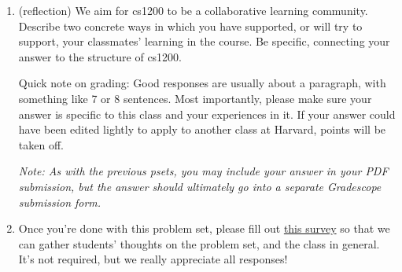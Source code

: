 \documentclass[11pt]{article}
\begin{document}
\begin{enumerate}
\begin{enumerate}
    \end{enumerate}
    
    \emph{Food for thought (do read - it's an important take-away from this problem):} This problem concerns size-augmented binary search trees. In lecture, we discussed AVL trees, which are balanced binary search trees where every vertex contains an additional \textit{height} attribute containing the length of the longest path from the vertex to a leaf (height-augmented). Additionally, every pair of siblings in the tree have heights differing by at most 1, so the tree is height-balanced. Note that if we augment a binary search tree both by size (as in the above problem) and by height (and use it to maintain the AVL property), then we create a dynamic data structure able to perform \texttt{search}, \texttt{insert}, and \texttt{select} all in time $O(\log n)$. 

\item (reflection) We aim for cs1200 to be a collaborative learning community. Describe two concrete ways in which you have supported, or will try to support, your classmates' learning in the course.  Be specific, connecting your answer to the structure of cs1200. 

Quick note on grading: Good responses are usually about a paragraph, with something like 7 or 8 sentences. Most importantly, please make sure your answer is specific to this class and your experiences in it. If your answer could have been edited lightly to apply to another class at Harvard, points will be taken off.

\textit{Note: As with the previous psets, you may include your answer in your PDF submission, but the answer should ultimately go into a separate Gradescope submission form.}
\item Once you're done with this problem set, please fill out \href{https://forms.gle/WzgUXMHuRKFV4L8t6}{this survey} so that we can gather students' thoughts on the problem set, and the class in general. It's not required, but we really appreciate all responses!

\end{enumerate}
\end{document}
